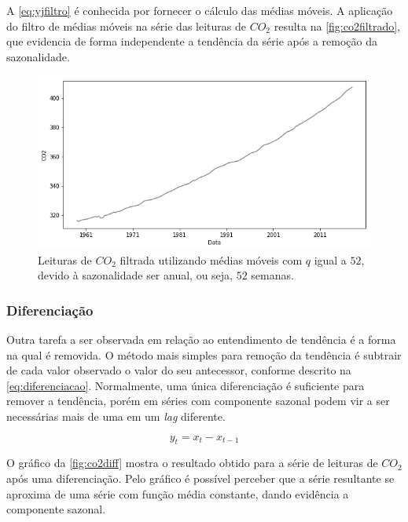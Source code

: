\documentclass[
    12pt,
    oneside,
    a4paper,
    english,
    brazil
]{abntex2}
\begin{document}
A \autoref{eq:yjfiltro} é conhecida por fornecer o cálculo das médias móveis. 
A aplicação do filtro de médias móveis na série das leituras de $CO_2$ resulta na \autoref{fig:co2filtrado}, que evidencia de forma independente a tendência da série após a remoção da sazonalidade.

\begin{figure}
    \centering
    \caption{Leituras de $CO_2$ filtrada utilizando médias móveis com $q$ igual
        a $52$, devido à sazonalidade ser anual, ou seja, $52$
        semanas.}\label{fig:co2filtrado}
    \includegraphics[width=.6\linewidth]{images/co2_filtered.png}
\end{figure}

\subsubsection{Diferenciação}\label{sec:diff}

Outra tarefa a ser observada em relação ao entendimento de tendência é a forma na qual é removida. O método mais simples para remoção da tendência é subtrair de cada valor observado o valor do seu antecessor, conforme descrito na \autoref{eq:diferenciacao}. Normalmente, uma única diferenciação é suficiente para remover a tendência, porém em séries com componente sazonal podem vir a ser necessárias mais de uma em um \textit{lag} diferente.

\begin{equation}
    \label{eq:diferenciacao}
    y_t = x_t - x_{t-1}
\end{equation}


O gráfico da \autoref{fig:co2diff} mostra o resultado obtido para a série de leituras de $CO_2$ após uma diferenciação. 
Pelo gráfico é possível perceber que a série resultante se aproxima de uma série com função média constante, dando evidência a componente sazonal.
\end{document}
